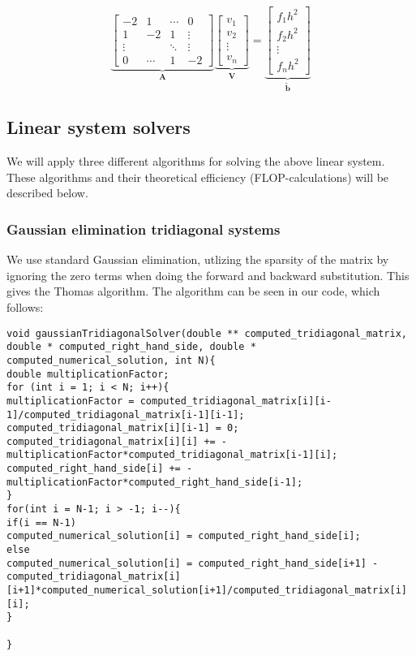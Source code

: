 \documentclass{article}
\begin{document}
\begin{equation}
\underbrace{\begin{bmatrix} -2 & 1 & \cdots & 0 \\ 1 & -2 & 1 & \vdots \\
\vdots & &  \ddots & \vdots \\ 
0 & \cdots & 1 & -2 \end{bmatrix}}_{\mathbf{A}} 
\underbrace{\begin{bmatrix} v_1\\ v_2 \\ \vdots\\ v_n \end{bmatrix}}_{\mathbf{V}} = 
\underbrace{\begin{bmatrix} f_1 h^2\\ f_2 h^2 \\ \vdots \\ f_nh^2\end{bmatrix}}_{\mathbf{\tilde{b}}}
\end{equation}

\subsection{Linear system solvers}
We will apply three different algorithms for solving the above linear system. These algorithms and their theoretical efficiency (FLOP-calculations) will be described below.

\subsubsection{Gaussian elimination tridiagonal systems}
We use standard Gaussian elimination, utlizing the sparsity of the matrix by ignoring the zero terms when doing the forward and backward substitution. This gives the Thomas algorithm. The algorithm can be seen in our code, which follows:

\begin{lstlisting}
void gaussianTridiagonalSolver(double ** computed_tridiagonal_matrix, double * computed_right_hand_side, double * computed_numerical_solution, int N){
double multiplicationFactor;
for (int i = 1; i < N; i++){
multiplicationFactor = computed_tridiagonal_matrix[i][i-1]/computed_tridiagonal_matrix[i-1][i-1];
computed_tridiagonal_matrix[i][i-1] = 0;
computed_tridiagonal_matrix[i][i] += - multiplicationFactor*computed_tridiagonal_matrix[i-1][i];
computed_right_hand_side[i] += - multiplicationFactor*computed_right_hand_side[i-1];
}
for(int i = N-1; i > -1; i--){
if(i == N-1)
computed_numerical_solution[i] = computed_right_hand_side[i];
else
computed_numerical_solution[i] = computed_right_hand_side[i+1] - computed_tridiagonal_matrix[i][i+1]*computed_numerical_solution[i+1]/computed_tridiagonal_matrix[i][i];
}

}
\end{lstlisting}
\end{document}
